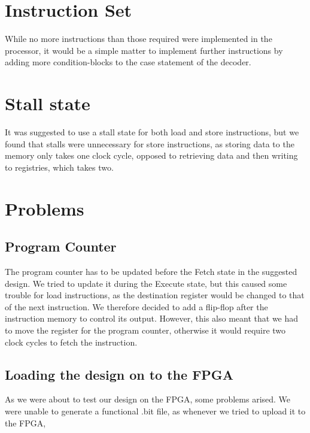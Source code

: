 \section{Instruction Set}

While no more instructions than those required were implemented in the processor, it would be a simple matter to implement further instructions by adding more condition-blocks to the case statement of the decoder.

\section{Stall state}

It was suggested to use a stall state for both load and store instructions, but we found that stalls were unnecessary for store instructions, as storing data to the memory only takes one clock cycle, opposed to retrieving data and then writing to registries, which takes two.

\section{Problems}

\subsection{Program Counter}

The program counter has to be updated before the Fetch state in the suggested design. We tried to update it during the Execute state, but this caused some trouble for load instructions, as the destination register would be changed to that of the next instruction. We therefore decided to add a flip-flop after the instruction memory to control its output. However, this also meant that we had to move the register for the program counter, otherwise it would require two clock cycles to fetch the instruction.

\subsection{Loading the design on to the FPGA}

As we were about to test our design on the FPGA, some problems arised. We were
unable to generate a functional .bit file, as whenever we tried to upload it to
the FPGA, 
